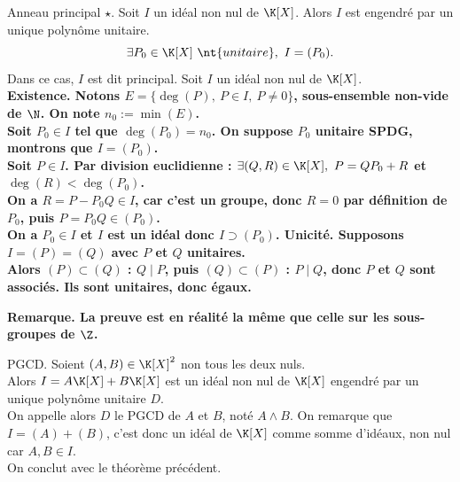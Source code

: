 \documentclass[11pt]{article}
\begin{document}
\vspace*{-0.7cm}

\begin{thm}{Anneau principal $\star$.}{}
    Soit $I$ un idéal non nul de $\K[X]$. Alors $I$ est engendré par un unique polynôme unitaire.
    \begin{equation*}
        \exists P_0 \in \K[X] ~\nt{unitaire}, ~ I=(P_0).
    \end{equation*}
    Dans ce cas, $I$ est dit principal.
    \tcblower
    Soit $I$ un idéal non nul de $\K[X]$.\\
    \bf{Existence.} Notons $E=\{\deg(P), ~ P\in I, ~ P\neq 0\}$, sous-ensemble non-vide de $\N$. On note $n_0:=\min(E)$.\\
    Soit $P_0\in I$ tel que $\deg(P_0)=n_0$. On suppose $P_0$ unitaire SPDG, montrons que $I=(P_0)$.\\
    \boxed{\subset} Soit $P\in I$. Par division euclidienne : $\exists (Q,R)\in\K[X], ~ P=QP_0+R$ et $\deg(R)<\deg(P_0)$.\\
    On a $R=P-P_0Q\in I$, car c'est un groupe, donc $R=0$ par définition de $P_0$, puis $P=P_0Q\in (P_0)$.\\
    \boxed{\supset} On a $P_0\in I$ et $I$ est un idéal donc $I \supset (P_0)$.\n
    \bf{Unicité.} Supposons $I=(P)=(Q)$ avec $P$ et $Q$ unitaires.\\
    Alors $(P)\subset(Q)$ : $Q \mid P$, puis $(Q)\subset(P)$ : $P\mid Q$, donc $P$ et $Q$ sont associés. Ils sont unitaires, donc égaux.
\end{thm}

\vspace*{-0.4cm}

\bf{Remarque.} La preuve est en réalité la même que celle sur les sous-groupes de $\Z$.

\begin{defi}{PGCD.}{}
    Soient $(A,B)\in\K[X]^2$ non tous les deux nuls.\\
    Alors $I=A\K[X]+B\K[X]$ est un idéal non nul de $\K[X]$ engendré par un unique polynôme unitaire $D$.\\
    On appelle alors $D$ le PGCD de $A$ et $B$, noté $A\land B$.
    \tcblower
    On remarque que $I=(A)+(B)$, c'est donc un idéal de $\K[X]$ comme somme d'idéaux, non nul car $A,B\in I$.\\
    On conclut avec le théorème précédent.
\end{defi}

\vspace*{-0.7cm}
\end{document}
